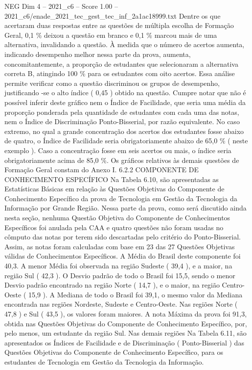 \begin{textsample}{NEG Dim 4 – 2021\_c6 – Score 1.00 – 2021\_c6/enade\_2021\_tec\_gest\_tec\_inf\_2a1ac18999.txt}
Dentre os que acertaram duas respostas entre as questões de múltipla escolha de Formação Geral, 0,1 \% deixou a questão em branco e 0,1 \% marcou mais de uma alternativa, invalidando a questão.
À medida que o número de acertos aumenta, indicando desempenho melhor nessa parte da prova, aumenta, concomitantemente, a proporção de estudantes que selecionaram a alternativa correta B, atingindo 100 \% para os estudantes com oito acertos.
Essa análise permite verificar como a questão discriminou os grupos de desempenho, justificando -se o alto índice ( 0,45 ) obtido na questão.
Cumpre notar que não é possível inferir deste gráfico nem o Índice de Facilidade, que seria uma média da proporção ponderada pela quantidade de estudantes com cada uma das notas, nem o Índice de Discriminação Ponto-Bisserial, por razão equivalente.
No caso extremo, no qual a grande concentração dos acertos dos estudantes fosse abaixo de quatro, o Índice de Facilidade seria obrigatoriamente abaixo de 65,0 \% ( neste exemplo ).
Caso a concentração fosse em seis acertos ou mais, o índice seria obrigatoriamente acima de 85,0 \%.
Os gráficos relativos às demais questões de Formação Geral constam do Anexo I. 6.2.2 COMPONENTE DE CONHECIMENTO ESPECÍFICO Na Tabela 6.10, são apresentadas as Estatísticas Básicas em relação às Questões Objetivas do Componente de Conhecimento Específico da prova de Tecnologia em Gestão da Tecnologia da Informação por Grande Região.
Nessa parte da prova, como será discutido ainda nesta seção, nenhuma Questão Objetiva do Componente de Conhecimentos Específicos foi anulada pela CAA e quatro questões não foram usadas no cômputo das notas por terem sido descartadas pelo critério do Ponto-Bisserial.
Assim, as notas foram calculadas com base em 23 das 27 Questões Objetivas válidas de Conhecimentos Específicos.
A Média do Brasil deste componente foi 40,3.
A menor Média foi observada na região Sudeste ( 39,4 ), e a maior, na região Sul ( 42,3 ).
O Desvio padrão de todo o Brasil foi 15,5, sendo o menor Desvio padrão encontrado na região Norte ( 14,7 ), e o maior, na região Centro-Oeste ( 15,9 ).
A Mediana de todo o Brasil foi 39,1, o mesmo valor da Mediana encontrada nas regiões Nordeste, Sudeste e Centro-Oeste.
Nas regiões Norte ( 47,8 ) e Sul ( 43,5 ), os valores foram maiores.
A nota Máxima da prova foi 91,3, obtida nas Questões Objetivas do Componente de Conhecimento Específico, por, pelo menos, um estudante da região Sul.
Nas demais regiões Na Tabela 6.11, são apresentados os Índices de Facilidade e de Discriminação ( Ponto-Bisserial ) das Questões Objetivas do Componente de Conhecimento Específico, para os estudantes de Tecnologia em Gestão da Tecnologia da Informação.

\end{textsample}
